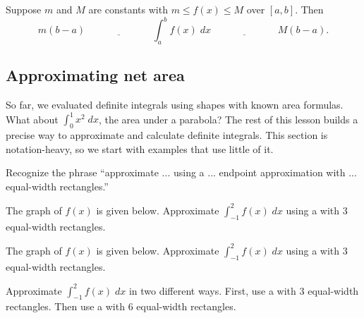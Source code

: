 \documentclass[../main.tex]{subfiles}
\begin{document}
\begin{exercise} \label{ex:comparison-bounds}
  Suppose \(m\) and \(M\) are constants with \(m \le f(x) \le M\) over \([a,b]\). Then
  \[
    m(b-a) \quad\underline{\hspace{2cm}}\quad \int_{a}^{b} f(x) \;dx \quad\underline{\hspace{2cm}}\quad M(b-a).
  \]

  \begin{center}
    
  \end{center}

\end{exercise}
\clearpage

\subsection{Approximating net area} \label{subsec:approximating-area}
So far, we evaluated definite integrals using shapes with known area formulas. What about \(\int_{0}^{1} x^{2} \;dx\), the area under a parabola? The rest of this lesson builds a precise way to approximate and calculate definite integrals.  This section is notation-heavy, so we start with examples that use little of it. 

\faStar{} Recognize the phrase \enquote{approximate ... using a ... endpoint approximation with ... equal-width rectangles.}

\begin{example}
  The graph of \(f(x)\) is given below.
  Approximate \(\int_{-1}^{2} f(x)\;dx\) using a  with \(3\) equal-width rectangles.

  

  \blanks*
\end{example}

\begin{example}
  The graph of \(f(x)\) is given below.
  Approximate \(\int_{-1}^{2} f(x)\;dx\) using a  with \(3\) equal-width rectangles.

  

  \blanks*
\end{example}
\clearpage

\begin{exercise} \label{ex:riemann-sketch-negative}
  Approximate \(\int_{-1}^{2} f(x) \;dx\) in two different ways. First, use a  with \(3\) equal-width rectangles. Then use a  with \(6\) equal-width rectangles.

  \hfill{}
  
  \hfill{}
  
  \hfill{}

  \blanks*
\end{exercise}
\end{document}
